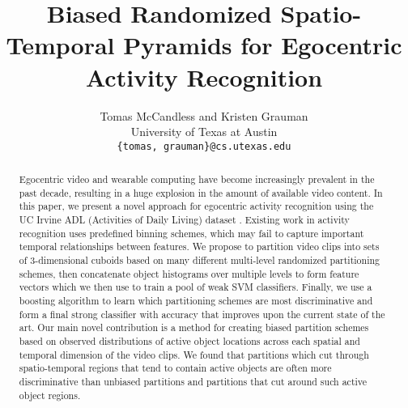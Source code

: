 \documentclass[10pt,twocolumn,letterpaper]{article}
\begin{document}
\title{Biased Randomized Spatio-Temporal Pyramids for Egocentric Activity Recognition}

\author{Tomas McCandless and Kristen Grauman\\
University of Texas at Austin\\
{\tt\small \{tomas, grauman\}@cs.utexas.edu}
}

\maketitle

\begin{abstract}
	Egocentric video and wearable computing have become increasingly
	prevalent in the past decade, resulting in a huge explosion in the amount
	of available video content. In this paper, we present a novel approach for
	egocentric activity recognition using the UC Irvine ADL (Activities of Daily Living)
	dataset \cite{Ramanan12}.  
  Existing work in activity recognition uses predefined binning schemes,
  which may fail to capture important temporal relationships between
  features.
  We propose to partition video clips into sets of
	3-dimensional cuboids based on many different multi-level randomized partitioning
	schemes, then concatenate object histograms
	over multiple levels to form feature vectors which we then use to train a pool
	of weak SVM classifiers. 
	Finally, we use a boosting algorithm to learn which partitioning schemes are
  most discriminative and form a
	final strong classifier with accuracy that improves upon the current state of
	the art. Our main novel contribution is a method for
	creating biased partition schemes based on observed distributions of
	active object locations across each spatial and temporal dimension of the video clips.
  We found that partitions which cut through spatio-temporal regions that
  tend to contain active objects are often more discriminative than
  unbiased partitions and 
  partitions that cut around such active object regions.
\end{abstract}
\end{document}
